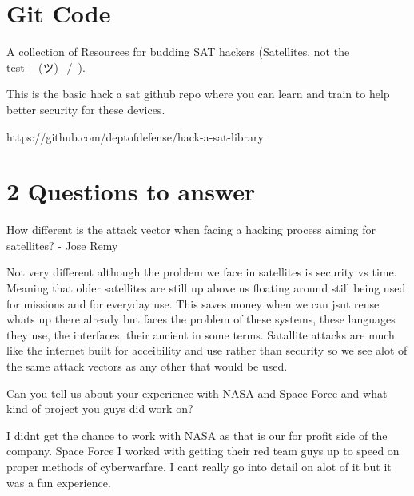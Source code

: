 \section{Git Code}
A collection of Resources for budding SAT hackers (Satellites, not the test¯\_(ツ)_/¯).

This is the basic hack a sat github repo where you can learn and train to help better security for these devices.

https://github.com/deptofdefense/hack-a-sat-library

\section{2 Questions to answer}
How different is the attack vector when facing a hacking process aiming for satellites? - Jose Remy

Not very different although the problem we face in satellites is security vs time. Meaning that older satellites are still up above us floating around still being used for missions and for everyday use. This saves money when we can jsut reuse whats up there already but faces the problem of these systems, these languages they use, the interfaces, their ancient in some terms. Satallite attacks are much like the internet built for acceibility and use rather than security so we see alot of the same attack vectors as any other that would be used.

Can you tell us about your experience with NASA and Space Force and what kind of project you guys did work on?

I didnt get the chance to work with NASA as that is our for profit side of the company. Space Force I worked with getting their red team guys up to speed on proper methods of cyberwarfare. I cant really go into detail on alot of it but it was a fun experience.




%
